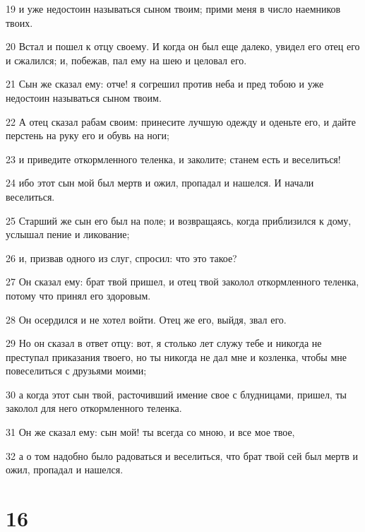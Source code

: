 \par 19 и уже недостоин называться сыном твоим; прими меня в число наемников твоих.
\par 20 Встал и пошел к отцу своему. И когда он был еще далеко, увидел его отец его и сжалился; и, побежав, пал ему на шею и целовал его.
\par 21 Сын же сказал ему: отче! я согрешил против неба и пред тобою и уже недостоин называться сыном твоим.
\par 22 А отец сказал рабам своим: принесите лучшую одежду и оденьте его, и дайте перстень на руку его и обувь на ноги;
\par 23 и приведите откормленного теленка, и заколите; станем есть и веселиться!
\par 24 ибо этот сын мой был мертв и ожил, пропадал и нашелся. И начали веселиться.
\par 25 Старший же сын его был на поле; и возвращаясь, когда приблизился к дому, услышал пение и ликование;
\par 26 и, призвав одного из слуг, спросил: что это такое?
\par 27 Он сказал ему: брат твой пришел, и отец твой заколол откормленного теленка, потому что принял его здоровым.
\par 28 Он осердился и не хотел войти. Отец же его, выйдя, звал его.
\par 29 Но он сказал в ответ отцу: вот, я столько лет служу тебе и никогда не преступал приказания твоего, но ты никогда не дал мне и козленка, чтобы мне повеселиться с друзьями моими;
\par 30 а когда этот сын твой, расточивший имение свое с блудницами, пришел, ты заколол для него откормленного теленка.
\par 31 Он же сказал ему: сын мой! ты всегда со мною, и все мое твое,
\par 32 а о том надобно было радоваться и веселиться, что брат твой сей был мертв и ожил, пропадал и нашелся.

\chapter{16}

